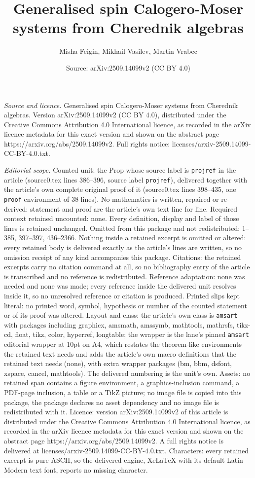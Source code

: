 \documentclass[10pt,a4paper]{amsart}
\title[Generalised spin Calogero-Moser systems from Cherednik algeb]{Generalised spin Calogero-Moser systems from Cherednik algebras}
\author{Misha Feigin, Mikhail Vasilev, Martin Vrabec}
\date{Source: arXiv:2509.14099v2 (CC BY 4.0)}
\begin{document}
\maketitle

\noindent\emph{Source and licence.} Generalised spin Calogero-Moser systems from Cherednik algebras. Version arXiv:2509.14099v2 (CC BY 4.0), distributed under the Creative Commons Attribution 4.0 International licence, as recorded in the arXiv licence metadata for this exact version and shown on the abstract page https://arxiv.org/abs/2509.14099v2. Full rights notice: licenses/arxiv-2509.14099-CC-BY-4.0.txt.\par\smallskip

\noindent\textit{Editorial scope.} Counted unit: the Prop whose source label is \texttt{projref} in the article (source0.tex lines 386--396, source label \texttt{projref}), delivered together with the article's own complete original proof of it (source0.tex lines 398--435, one \texttt{proof} environment of 38 lines). No mathematics is written, repaired or re-derived: statement and proof are the article's own text line for line. Required context retained uncounted: none. Every definition, display and label of those lines is retained unchanged. Omitted from this package and not redistributed: 1--385, 397--397, 436--2366. Nothing inside a retained excerpt is omitted or altered: every retained body is delivered exactly as the article's lines are written, so no omission receipt of any kind accompanies this package. Citations: the retained excerpts carry no citation command at all, so no bibliography entry of the article is transcribed and no reference is redistributed. Reference adaptation: none was needed and none was made; every reference inside the delivered unit resolves inside it, so no unresolved reference or citation is produced. Printed slips kept literal: no printed word, symbol, hypothesis or number of the counted statement or of its proof was altered. Layout and class: the article's own class is \texttt{amsart} with packages including graphicx, amsmath, amssymb, mathtools, mathrsfs, tikz-cd, float, tikz, color, hyperref, longtable; the wrapper is the lane's pinned \texttt{amsart} editorial wrapper at 10pt on A4, which restates the theorem-like environments the retained text needs and adds the article's own macro definitions that the retained text needs (none), with extra wrapper packages (bm, bbm, dsfont, xspace, cancel, mathtools). The delivered numbering is the unit's own. Assets: no retained span contains a figure environment, a graphics-inclusion command, a PDF-page inclusion, a table or a TikZ picture; no image file is copied into this package, the package declares no asset dependency and no image file is redistributed with it. Licence: version arXiv:2509.14099v2 of this article is distributed under the Creative Commons Attribution 4.0 International licence, as recorded in the arXiv licence metadata for this exact version and shown on the abstract page https://arxiv.org/abs/2509.14099v2. A full rights notice is delivered at licenses/arxiv-2509.14099-CC-BY-4.0.txt. Characters: every retained excerpt is pure ASCII, so the delivered engine, XeLaTeX with its default Latin Modern text font, reports no missing character.
\end{document}
